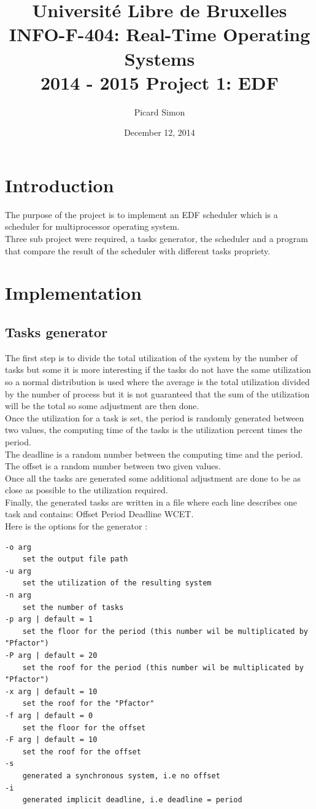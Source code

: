\documentclass[a4paper,12pt]{article}
\title{Université Libre de Bruxelles\\
INFO-F-404: Real-Time Operating Systems\\
2014 - 2015 Project 1: EDF}
\author{Picard Simon}
\date{December 12, 2014}
\begin{document}
\maketitle
\clearpage
\tableofcontents
\clearpage

\section{Introduction}
The purpose of the project is to implement an EDF scheduler which is a scheduler for multiprocessor operating system.\\
Three sub project were required, a tasks generator, the scheduler and a program that compare the result of the scheduler with different tasks propriety.

\section{Implementation}
\subsection{Tasks generator}
The first step is to divide the total utilization of the system by the number of tasks but some it is more interesting if the tasks do not have the same utilization so a normal distribution is used where the average is the total utilization divided by the number of process but it is not guaranteed that the sum of the utilization will be the total so some adjustment are then done.\\
Once the utilization for a task is set, the period is randomly generated between two values, the computing time of the tasks is the utilization percent times the period.\\
The deadline is a random number between the computing time and the period.\\
The offset is a random number between two given values.\\
Once all the tasks are generated some additional adjustment are done to be as close as possible to the utilization required.\\
Finally, the generated tasks are written in a file where each line describes one task and contains: Offset Period Deadline WCET.\\
Here is the options for the generator :
\begin{verbatim}
-o arg
    set the output file path
-u arg
    set the utilization of the resulting system
-n arg
    set the number of tasks
-p arg | default = 1
    set the floor for the period (this number wil be multiplicated by "Pfactor")
-P arg | default = 20
    set the roof for the period (this number wil be multiplicated by "Pfactor")
-x arg | default = 10
    set the roof for the "Pfactor"
-f arg | default = 0
    set the floor for the offset
-F arg | default = 10
    set the roof for the offset
-s
    generated a synchronous system, i.e no offset
-i
    generated implicit deadline, i.e deadline = period
\end{verbatim}
\end{document}

